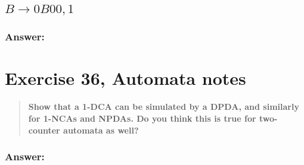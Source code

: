 \documentclass[titlepage]{article}\usepackage[]{graphicx}\usepackage[]{color}
\begin{document}
\subsection{\(B \to 0B00,1\)}
\subsubsection*{Answer:}
\vspace{5cm}

\section{Exercise 36, Automata notes}
\begin{quote}
  \textbf{Show that a 1-DCA can be simulated by a DPDA, and similarly for
  1-NCAs and NPDAs. Do you think this is true for two-counter automata as well?}
\end{quote}
\subsubsection{Answer:}
\vspace{5cm}
\end{document}
